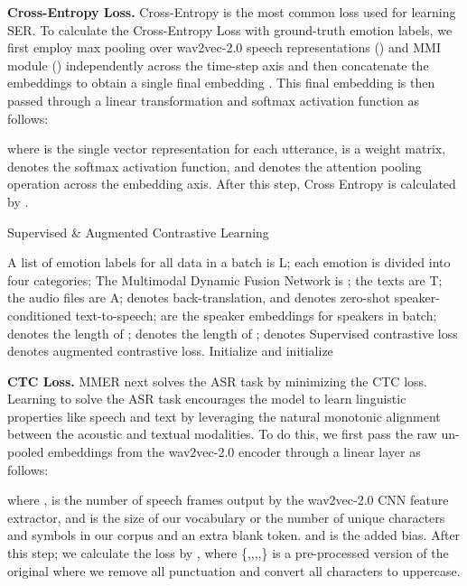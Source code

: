 \documentclass{INTERSPEECH2023}
\begin{document}
{\noindent \textbf{Cross-Entropy Loss.}} Cross-Entropy is the most common loss used for learning SER. To calculate the Cross-Entropy Loss with ground-truth emotion labels, we first employ max pooling  over wav2vec-2.0 speech representations () and MMI module () independently across the time-step axis and then concatenate the embeddings to obtain a single final embedding .  This final embedding is then passed through a linear transformation and softmax activation function as follows:



where    is the single vector representation for each utterance,    is a weight matrix,  denotes the softmax activation function, and  denotes the attention pooling operation across the embedding axis. After this step, Cross Entropy is calculated by .
\vspace{1mm}

\begin{algorithm}[t]
\scriptsize
\caption{Supervised \& Augmented Contrastive Learning}\label{alg:cap}
\begin{algorithmic}
\Require A list of emotion labels for all data in a batch is L; each emotion is divided into four categories; The Multimodal Dynamic Fusion Network is ; the texts are T; the audio files are A;  denotes back-translation, and  denotes zero-shot speaker-conditioned text-to-speech;  are the speaker embeddings for speakers in batch;  denotes the length of ;  denotes the length of ;  denotes Supervised contrastive loss  denotes augmented contrastive loss.
\State Initialize  and 
\For{}
    \State initialize 
    \For{}
            \State 
        \EndIf
    \EndFor 
    \State 
\EndFor
\State 
\State 
\State 
\State 
\State 
\State 
\For{}
    \State 
\EndFor 
\State 
\State 
\State 
\State 
\State \Return  
\end{algorithmic}
\end{algorithm}

{\noindent \textbf{CTC Loss.}} MMER next solves the ASR task by minimizing the CTC loss. Learning to solve the ASR task encourages the model to learn linguistic properties like speech and text by leveraging the natural monotonic alignment between the acoustic and textual modalities. To do this, we first pass the raw un-pooled embeddings  from the wav2vec-2.0 encoder through a linear layer as follows:



where   ,  is the number of speech frames output by the wav2vec-2.0 CNN feature extractor, and  is the size of our vocabulary or the number of unique characters and symbols in our corpus and an extra blank token.    and  is the added bias. After this step; we calculate the  loss by , where   \{,,,,\} is a pre-processed version of the original  where we remove all punctuation and convert all characters to uppercase.
\vspace{1mm}
\end{document}
